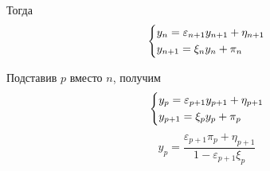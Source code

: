 Тогда
\begin{equation*}
    \begin{dcases}
        y_n = \varepsilon_{n+1}y_{n+1}+\eta_{n+1} \\
        y_{n+1} = \xi_{n}y_{n} + \pi_{n} \\
    \end{dcases}
\end{equation*}

Подставив $p$ вместо $n$, получим
\begin{equation*}
    \begin{dcases}
        y_p = \varepsilon_{p+1}y_{p+1}+\eta_{p+1} \\
        y_{p+1} = \xi_{p}y_{p} + \pi_{p} \\
    \end{dcases}
\end{equation*}
\begin{equation*}
    y_p = \frac{\varepsilon_{p+1}\pi_p + \eta_{p+1}}{1 - \varepsilon_{p+1}\xi_{p}}
\end{equation*}

